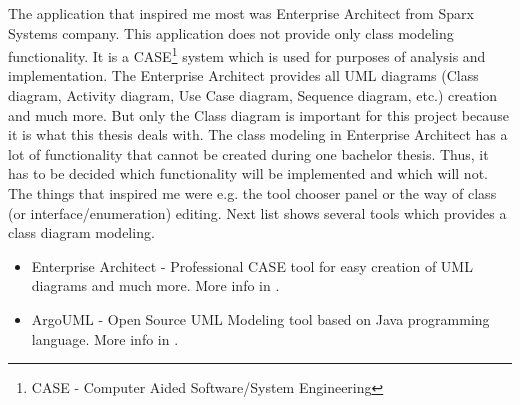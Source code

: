The application that inspired me most was Enterprise Architect from Sparx Systems \cite{sparxsystemsweb} company. This application does not provide only class modeling functionality. It is a CASE\footnote{CASE - Computer Aided Software/System Engineering} system which is used for purposes of analysis and implementation. The Enterprise Architect provides all UML diagrams (Class diagram, Activity diagram, Use Case diagram, Sequence diagram, etc.) creation and much more. But only the Class diagram is important for this project because it is what this thesis deals with. The class modeling in Enterprise Architect has a lot of functionality that cannot be created during one bachelor thesis. Thus, it has to be decided which functionality will be implemented and which will not. The things that inspired me were e.g. the tool chooser panel or the way of class (or interface/enumeration) editing. Next list shows several tools which provides a class diagram modeling.

\begin{itemize}
    \item Enterprise Architect - Professional CASE tool for easy creation of UML diagrams and much more. More info in \cite{sparxsystemsweb}.
    \item ArgoUML - Open Source UML Modeling tool based on Java programming language. More info in \cite{ArgoUMLWeb}.
\end{itemize}
